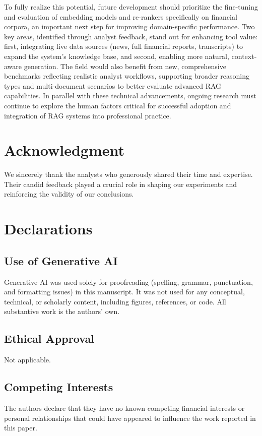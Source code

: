 \documentclass[final,5p,times,twopage,twocolumn,a4paper]{elsarticle}
\begin{document}
To fully realize this potential, future development should prioritize the fine-tuning and evaluation of embedding models and re-rankers specifically on financial corpora, an important next step for improving domain-specific performance. Two key areas, identified through analyst feedback, stand out for enhancing tool value: first, integrating live data sources (news, full financial reports, transcripts) to expand the system's knowledge base, and second, enabling more natural, context-aware generation. The field would also benefit from new, comprehensive benchmarks reflecting realistic analyst workflows, supporting broader reasoning types and multi-document scenarios to better evaluate advanced RAG capabilities. In parallel with these technical advancements, ongoing research must continue to explore the human factors critical for successful adoption and integration of RAG systems into professional practice.


\section*{Acknowledgment}
We sincerely thank the analysts who generously shared their time and expertise. Their candid feedback played a crucial role in shaping our experiments and reinforcing the validity of our conclusions.

\section*{Declarations}
\subsection*{Use of Generative AI}
Generative AI was used solely for proofreading (spelling, grammar, punctuation, and formatting issues) in this manuscript. It was not used for any conceptual, technical, or scholarly content, including figures, references, or code. All substantive work is the authors' own.



\subsection*{Ethical Approval}
Not applicable.

\subsection*{Competing Interests}
The authors declare that they have no known competing financial interests or personal relationships that could have appeared to influence the work reported in this paper.
\end{document}
